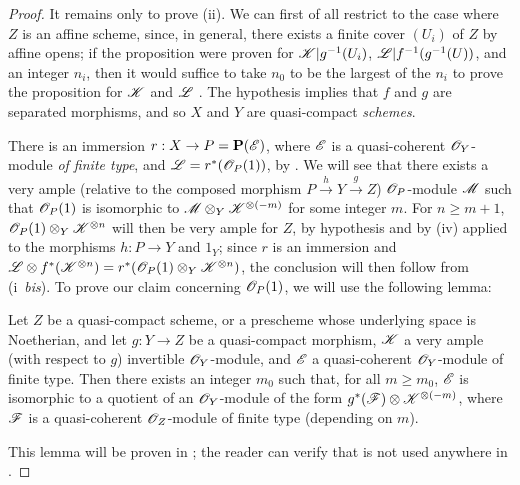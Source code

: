 \begin{proof}
It remains only to prove (ii).
We can first of all restrict to the case where $Z$ is an affine scheme, since, in general, there exists a finite cover $(U_i)$ of $Z$ by affine opens;
if the proposition were proven for $\mathscr{K}|g^{-1}(U_i)$, $\mathscr{L}|f^{-1}(g^{-1}(U))$, and an integer $n_i$, then it would suffice to take $n_0$ to be the largest of the $n_i$ to prove the proposition for $\mathscr{K}$ and $\mathscr{L}$ .
The hypothesis implies that $f$ and $g$ are separated morphisms, and so $X$ and $Y$ are quasi-compact \emph{schemes}.

There is an immersion $r:X\to P=\bb{P}(\sh{E})$, where $\mathscr{E}$ is a quasi-coherent $\mathscr{O}_Y$-module \emph{of finite type}, and $\mathscr{L}=r^*(\mathscr{O}_P(1))$, by .
We will see that there exists a very ample (relative to the composed morphism $P\xrightarrow{h}Y\xrightarrow{g}Z$) $\mathscr{O}_P$-module $\mathscr{M}$ such that $\mathscr{O}_P(1)$ is isomorphic to $\mathscr{M}\otimes_Y\mathscr{K}^{\otimes(-m)}$ for some integer $m$.
For $n\geq m+1$, $\mathscr{O}_P(1)\otimes_Y\mathscr{K}^{\otimes n}$ will then be very ample for $Z$, by hypothesis and by (iv) applied to the morphisms $h:P\to Y$ and $1_Y$;
since $r$ is an immersion and $\mathscr{L}\otimes f^*(\mathscr{K}^{\otimes n}) = r^*(\mathscr{O}_P(1)\otimes_Y\mathscr{K}^{\otimes n})$, the conclusion will then follow from (i~\emph{bis}).
To prove our claim concerning $\mathscr{O}_P(1)$, we will use the following lemma:

  \begin{lemma}[4.4.10.1]
  \label{II.4.4.10.1}
  Let $Z$ be a quasi-compact scheme, or a prescheme whose underlying space is Noetherian, and let $g:Y\to Z$ be a quasi-compact morphism, $\mathscr{K}$ a very ample (with respect to $g$) invertible $\mathscr{O}_Y$-module, and $\mathscr{E}$ a quasi-coherent $\mathscr{O}_Y$-module of finite type.
  Then there exists an integer $m_0$ such that, for all $m\geq m_0$, $\mathscr{E}$ is isomorphic to a quotient of an $\mathscr{O}_Y$-module of the form $g^*(\mathscr{F})\otimes\mathscr{K}^{\otimes(-m)}$, where $\mathscr{F}$ is a quasi-coherent $\mathscr{O}_Z$-module of finite type (depending on $m$).
  \end{lemma}

This lemma will be proven in ;
the reader can verify that  is not used anywhere in .


\end{proof}

